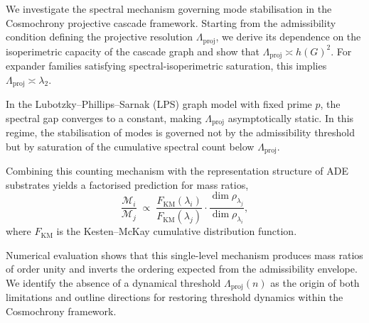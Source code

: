 We investigate the spectral mechanism governing mode stabilisation in the
Cosmochrony projective cascade framework.
Starting from the admissibility condition defining the projective resolution
$\Lambda_{\mathrm{proj}}$, we derive its dependence on the isoperimetric
capacity of the cascade graph and show that
$\Lambda_{\mathrm{proj}} \asymp h(G)^2$.
For expander families satisfying spectral-isoperimetric saturation, this
implies $\Lambda_{\mathrm{proj}} \asymp \lambda_2$.

In the Lubotzky--Phillips--Sarnak (LPS) graph model with fixed prime $p$,
the spectral gap converges to a constant, making $\Lambda_{\mathrm{proj}}$
asymptotically static.
In this regime, the stabilisation of modes is governed not by the admissibility
threshold but by saturation of the cumulative spectral count below
$\Lambda_{\mathrm{proj}}$.

Combining this counting mechanism with the representation structure of ADE
substrates yields a factorised prediction for mass ratios,
\[
  \frac{\mathcal{M}_i}{\mathcal{M}_j}
  \;\propto\;
  \frac{F_{\mathrm{KM}}(\lambda_i)}{F_{\mathrm{KM}}(\lambda_j)}
  \cdot
  \frac{\dim\rho_{\lambda_j}}{\dim\rho_{\lambda_i}},
\]
where $F_{\mathrm{KM}}$ is the Kesten--McKay cumulative distribution function.

Numerical evaluation shows that this single-level mechanism produces mass
ratios of order unity and inverts the ordering expected from the admissibility
envelope.
We identify the absence of a dynamical threshold $\Lambda_{\mathrm{proj}}(n)$
as the origin of both limitations and outline directions for restoring
threshold dynamics within the Cosmochrony framework.
